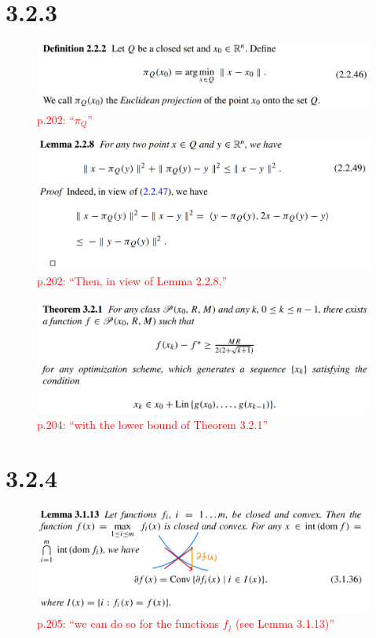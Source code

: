 \documentclass[a4paper, 14pt, dvipdfmx]{extarticle}
\newcommand{\red}[1]{\textcolor{red}{#1}}
\begin{document}
\section*{3.2.3}

\begin{figure}[H]
    \centering
    \includegraphics[width=\columnwidth]{def222.png}
    \caption{\red{p.202: ``$\pi_Q$''}}
\end{figure}

\begin{figure}[H]
    \centering
    \includegraphics[width=\columnwidth]{lem228.png}
    \caption{\red{p.202: ``Then, in view of Lemma 2.2.8,''}}
\end{figure}

\begin{figure}[H]
    \centering
    \includegraphics[width=\columnwidth]{thm321.png}
    \caption{\red{p.204: ``with the lower bound of Theorem 3.2.1''}}
\end{figure}


\section*{3.2.4}

\begin{figure}[H]
    \centering
    \includegraphics[width=\columnwidth]{lem3113.png}
    \caption{\red{p.205: ``we can do so for the functions $f_j$ (see Lemma 3.1.13)''}}
\end{figure}
\end{document}
